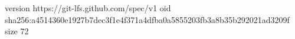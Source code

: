 version https://git-lfs.github.com/spec/v1
oid sha256:a4514360e1927b7dec3f1e4f371a4dfba0a5855203fb3a8b35b292021ad3209f
size 72
